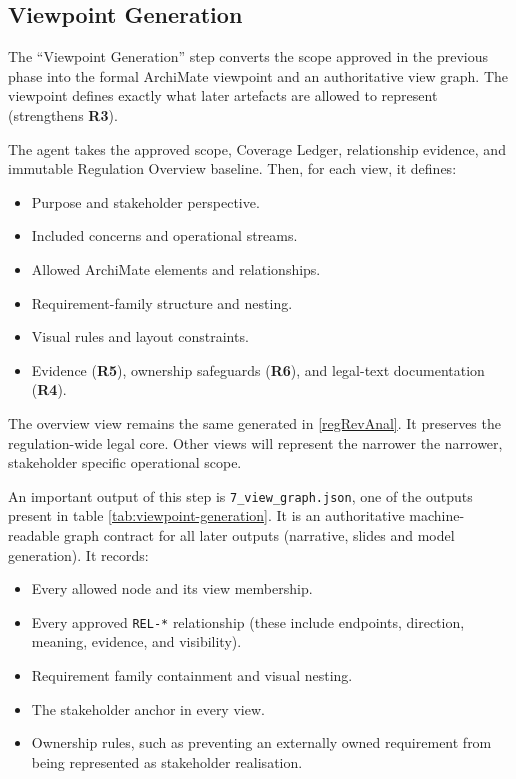 \subsection{Viewpoint Generation}

The ``Viewpoint Generation'' step converts the scope approved in the previous phase into the formal ArchiMate viewpoint and an authoritative view graph. The viewpoint defines exactly what later artefacts are allowed to represent (strengthens \textbf{R3}).

The agent takes the approved scope, Coverage Ledger, relationship evidence, and immutable Regulation Overview baseline. Then, for each view, it defines:
\begin{itemize}
    \item Purpose and stakeholder perspective.
    \item Included concerns and operational streams.
    \item Allowed ArchiMate elements and relationships.
    \item Requirement-family structure and nesting.
    \item Visual rules and layout constraints.
    \item Evidence (\textbf{R5}), ownership safeguards (\textbf{R6}), and legal-text documentation (\textbf{R4}). 
\end{itemize}

The overview view remains the same generated in \ref{regRevAnal}. It preserves the regulation-wide legal core. Other views will represent the narrower the narrower, stakeholder specific operational scope.

An important output of this step is \texttt{7\_view\_graph.json}, one of the outputs present in table \ref{tab:viewpoint-generation}. It is an authoritative machine-readable graph contract for all later outputs (narrative, slides and model generation). It records:
\begin{itemize}
    \item Every allowed node and its view membership.
    \item Every approved \texttt{REL-*} relationship (these include endpoints, direction, meaning, evidence, and visibility).
    \item Requirement family containment and visual nesting.
    \item The stakeholder anchor in every view.
    \item Ownership rules, such as preventing an externally owned requirement from being represented as stakeholder realisation.
\end{itemize}

